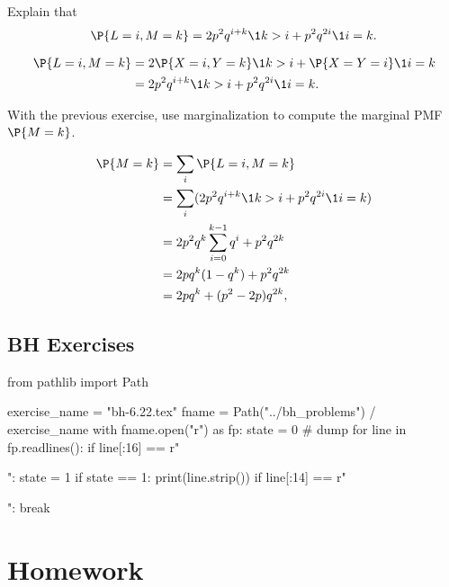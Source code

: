 \begin{exercise}\label{ex:2}
Explain that
\begin{equation*}
\P{L=i, M=k} = 2p^{2}q^{i+k}\1{k>i}+ p^{2}q^{2i}\1{i=k}.
\end{equation*}
\begin{solution}
  \begin{align*}
\P{L=i, M=k}
&= 2\P{X=i, Y=k}\1{k>i} + \P{X=Y=i}\1{i=k} \\
&= 2p^{2}q^{i+k}\1{k>i}+ p^{2}q^{2i}\1{i=k}.
  \end{align*}
\end{solution}
\end{exercise}

\begin{exercise}
With the previous exercise, use marginalization to compute the marginal PMF $\P{M=k}$.
\begin{solution}
  \begin{align*}
\P{M=k}
&= \sum_{i} \P{L=i, M=k} \\
 &= \sum_{i} (2p^{2}q^{i+k}\1{k>i}+ p^{2}q^{2i}\1{i=k}) \\
 &= 2p^2q^k\sum_{i=0}^{k-1} q^{i}+ p^{2}q^{2k} \\
 &= 2pq^k (1-q^{k})+ p^{2}q^{2k} \\
 &= 2pq^k + (p^{2}-2p) q^{2k},
  \end{align*}
\end{solution}
\end{exercise}


\subsection{BH Exercises}
\label{sec:bh-exercises}

\begin{pycode}
from pathlib import Path

exercise_name = "bh-6.22.tex"
fname = Path("../bh_problems") / exercise_name
with fname.open("r") as fp:
    state = 0  # dump
    for line in fp.readlines():
        if line[:16] == r"\begin{exercise}":
            state = 1
        if state == 1:
            print(line.strip())
        if line[:14] == r"\end{exercise}":
            break
\end{pycode}



\section{Homework}
\label{sec:homework}


